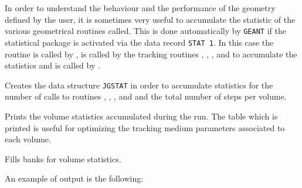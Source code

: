        
       

In order to understand the behaviour and the performance of the 
geometry defined by the user, it is sometimes very useful to
accumulate the statistic of the various geometrical routines called.
This is done automatically by {\tt GEANT} if the statistical package
is activated via the data record {\tt STAT 1}. In this case the routine
 is called by ,  is called by
the tracking routines , , ,
 and  to accumulate the statistics and 
is called by .

Creates the data structure {\tt JGSTAT} in order to accumulate
statistics for the number of calls to routines
, , ,
 and 
and the total number of steps per volume.

Prints the volume statistics accumulated during the run. The
table which is printed is useful for optimizing the tracking
medium parameters associated to each volume.

Fills banks for volume statistics.
 
An example of output is the following:

